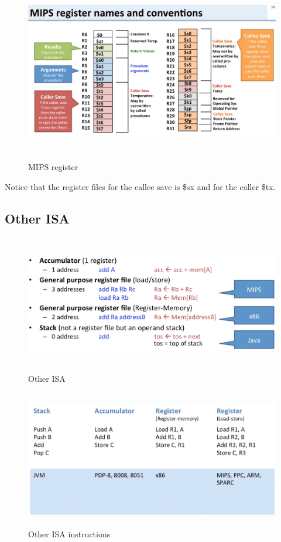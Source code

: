 \documentclass{article}
\begin{document}
\begin{figure}[h]
    \vspace{10mm}
    \centering
    \includegraphics[width=16cm, height=8cm]{image/mips-register.png} 
    \caption{MIPS register}
\end{figure}

Notice that the register files for the callee save is \$sx and for the caller \$tx.

\newpage
\subsection{Other ISA}
\begin{figure}[h]
    \vspace{10mm}
    \centering
    \includegraphics[width=16cm, height=6cm]{image/other-isa.png} 
    \caption{Other ISA}
\end{figure}

\begin{figure}[h]
    \vspace{10mm}
    \centering
    \includegraphics[width=16cm, height=6cm]{image/other-isa-instructions.png} 
    \caption{Other ISA instructions}
    \label{other-isa-instructions}
\end{figure}
\end{document}
